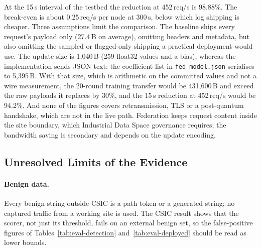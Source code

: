 \begin{table}[t]
\centering
\caption{Daily cloud-bound traffic for two gateways, analytic, 1{,}040\,B per update (\texttt{bandwidth\_results.json}). The 99.94\% figure applies to the 300\,s interval; the deployed interval is 15\,s.}
\label{tab:eval-bandwidth}
\end{table}

At the 15\,s interval of the testbed the reduction at 452\,req/s is 98.88\%. The break-even is about 0.25\,req/s per node at 300\,s, below which log shipping is cheaper. Three assumptions limit the comparison. The baseline ships every request's payload only (27.4\,B on average), omitting headers and metadata, but also omitting the sampled or flagged-only shipping a practical deployment would use. The update size is 1{,}040\,B (259 float32 values and a bias), whereas the implementation sends JSON text: the coefficient list in \texttt{fed\_model.json} serialises to 5{,}395\,B. With that size, which is arithmetic on the committed values and not a wire measurement, the 20-round training transfer would be 431{,}600\,B and exceed the raw payloads it replaces by 30\%, and the 15\,s reduction at 452\,req/s would be 94.2\%. And none of the figures covers retransmission, TLS or a post-quantum handshake, which are not in the live path. Federation keeps request content inside the site boundary, which Industrial Data Space governance requires; the bandwidth saving is secondary and depends on the update encoding.

\subsection{Unresolved Limits of the Evidence}
\label{sec:eval-limits}

\paragraph{Benign data.}
Every benign string outside CSIC is a path token or a generated string; no captured traffic from a working site is used. The CSIC result shows that the scorer, not just its threshold, fails on an external benign set, so the false-positive figures of Tables~\ref{tab:eval-detection} and~\ref{tab:eval-deployed} should be read as lower bounds.

